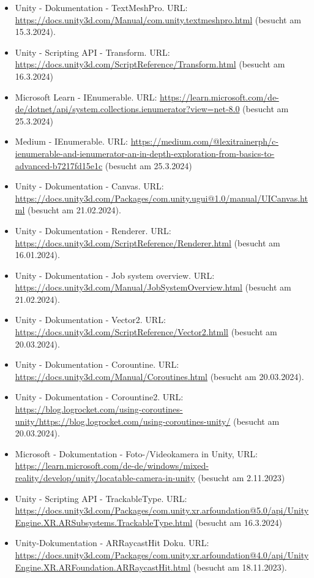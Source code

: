 \begin{itemize}[leftmargin=0pt]
    \item Unity - Dokumentation - TextMeshPro. {\scriptsize URL:}  \url{https://docs.unity3d.com/Manual/com.unity.textmeshpro.html} (besucht am 15.3.2024).
    \item Unity - Scripting API - Transform. {\scriptsize URL:}  \url{https://docs.unity3d.com/ScriptReference/Transform.html} (besucht am 16.3.2024)
    \item Microsoft Learn - IEnumerable. {\scriptsize URL:}  \url{https://learn.microsoft.com/de-de/dotnet/api/system.collections.ienumerator?view=net-8.0} (besucht am 25.3.2024)
    \item Medium - IEnumerable. {\scriptsize URL:}  \url{https://medium.com/@lexitrainerph/c-ienumerable-and-ienumerator-an-in-depth-exploration-from-basics-to-advanced-b7217fd15e1c} (besucht am 25.3.2024)
    \item Unity - Dokumentation -  Canvas. {\scriptsize URL:} \url{https://docs.unity3d.com/Packages/com.unity.ugui@1.0/manual/UICanvas.html} (besucht am 21.02.2024).
    \item Unity - Dokumentation - Renderer. {\scriptsize URL:} \url{https://docs.unity3d.com/ScriptReference/Renderer.html} (besucht am 16.01.2024).
    \item Unity - Dokumentation - Job system overview. {\scriptsize URL:} \url{https://docs.unity3d.com/Manual/JobSystemOverview.html} (besucht am 21.02.2024).
    \item Unity - Dokumentation - Vector2. {\scriptsize URL:} \url{https://docs.unity3d.com/ScriptReference/Vector2.htmll} (besucht am 20.03.2024).
    \item Unity - Dokumentation - Corountine. {\scriptsize URL:} \url{https://docs.unity3d.com/Manual/Coroutines.html} (besucht am 20.03.2024).
    \item Unity - Dokumentation - Corountine2. {\scriptsize URL:} \url{https://blog.logrocket.com/using-coroutines-unity/https://blog.logrocket.com/using-coroutines-unity/} (besucht am 20.03.2024).
    \item Microsoft - Dokumentation - Foto-/Videokamera in Unity, {\scriptsize URL:} \url{https://learn.microsoft.com/de-de/windows/mixed-reality/develop/unity/locatable-camera-in-unity} (besucht am 2.11.2023)
    \item Unity - Scripting API - TrackableType. {\scriptsize URL:}  \url{https://docs.unity3d.com/Packages/com.unity.xr.arfoundation@5.0/api/UnityEngine.XR.ARSubsystems.TrackableType.html} (besucht am 16.3.2024)
    \item Unity-Dokumentation - ARRaycastHit Doku. {\scriptsize URL:}  \url{https://docs.unity3d.com/Packages/com.unity.xr.arfoundation@4.0/api/UnityEngine.XR.ARFoundation.ARRaycastHit.html} (besucht am 18.11.2023).

\end{itemize}
